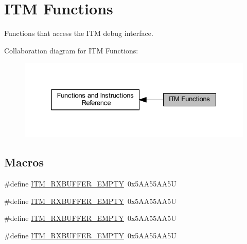 \hypertarget{group___c_m_s_i_s__core___debug_functions}{}\section{I\+TM Functions}
\label{group___c_m_s_i_s__core___debug_functions}


Functions that access the I\+TM debug interface.  


Collaboration diagram for I\+TM Functions\+:
\nopagebreak
\begin{figure}[H]
\begin{center}
\leavevmode
\includegraphics[width=325pt]{group___c_m_s_i_s__core___debug_functions}
\end{center}
\end{figure}
\subsection*{Macros}
\begin{DoxyCompactItemize}
\item 
\#define \hyperlink{group___c_m_s_i_s__core___debug_functions_gaa822cb398ee022b59e9e6c5d7bbb228a}{I\+T\+M\+\_\+\+R\+X\+B\+U\+F\+F\+E\+R\+\_\+\+E\+M\+P\+TY}~0x5\+A\+A55\+A\+A5U
\item 
\#define \hyperlink{group___c_m_s_i_s__core___debug_functions_gaa822cb398ee022b59e9e6c5d7bbb228a}{I\+T\+M\+\_\+\+R\+X\+B\+U\+F\+F\+E\+R\+\_\+\+E\+M\+P\+TY}~0x5\+A\+A55\+A\+A5U
\item 
\#define \hyperlink{group___c_m_s_i_s__core___debug_functions_gaa822cb398ee022b59e9e6c5d7bbb228a}{I\+T\+M\+\_\+\+R\+X\+B\+U\+F\+F\+E\+R\+\_\+\+E\+M\+P\+TY}~0x5\+A\+A55\+A\+A5U
\item 
\#define \hyperlink{group___c_m_s_i_s__core___debug_functions_gaa822cb398ee022b59e9e6c5d7bbb228a}{I\+T\+M\+\_\+\+R\+X\+B\+U\+F\+F\+E\+R\+\_\+\+E\+M\+P\+TY}~0x5\+A\+A55\+A\+A5U
\end{DoxyCompactItemize}
